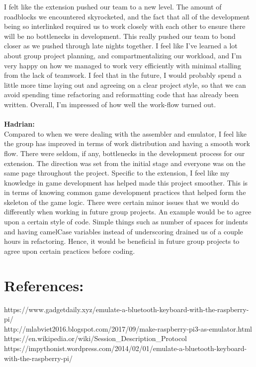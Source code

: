 \documentclass[a4paper]{article}
\begin{document}
I felt like the extension pushed our team to a new level. The amount of roadblocks we encountered skyrocketed, and the fact that all of the development being so interlinked required us to work closely with each other to ensure there will be no bottlenecks in development. This really pushed our team to bond closer as we pushed through late nights together. I feel like I've learned a lot about group project planning, and compartmentalizing our workload, and I'm very happy on how we managed to work very efficiently with minimal stalling from the lack of teamwork. I feel that in the future, I would probably spend a little more time laying out and agreeing on a clear project style, so that we can avoid spending time refactoring and reformatting code that has already been written. Overall, I'm impressed of how well the work-flow turned out.\\
\\
\textbf{Hadrian:}\\
Compared to when we were dealing with the assembler and emulator, I feel like the group has improved in terms of work distribution and having a smooth work flow. There were seldom, if any, bottlenecks in the development process for our extension. The direction was set from the initial stage and everyone was on the same page throughout the project. Specific to the extension, I feel like my knowledge in game development has helped made this project smoother. This is in terms of knowing common game development practices that helped form the skeleton of the game logic. There were certain minor issues that we would do differently when working in future group projects. An example would be to agree upon a certain style of code. Simple things such as number of spaces for indents and having camelCase variables instead of underscoring drained us of a couple hours in refactoring. Hence, it would be beneficial in future group projects to agree upon certain practices before coding.

\section{References:}
https://www.gadgetdaily.xyz/emulate-a-bluetooth-keyboard-with-the-raspberry-pi/\\
http://mlabviet2016.blogspot.com/2017/09/make-raspberry-pi3-as-emulator.html\\
https://en.wikipedia.or/wiki/Session\_Description\_Protocol\\
https://impythonist.wordpress.com/2014/02/01/emulate-a-bluetooth-keyboard-with-the-raspberry-pi/
\end{document}
